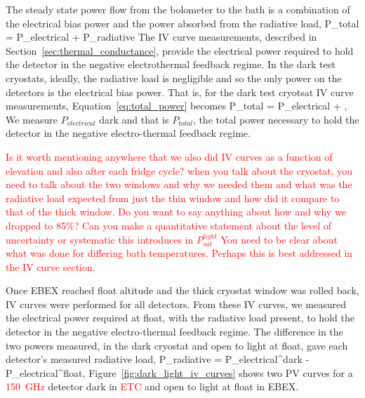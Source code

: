 The steady state power flow from the bolometer to the bath is a combination of the electrical bias power and the power absorbed from the radiative load,
\be
P_{total} = P_{electrical} + P_{radiative}
\label{eq:total_power}
\ee
The IV curve measurements, described in Section~\ref{sec:thermal_conductance}, provide the electrical power required to hold the detector in the negative electrothermal feedback regime. 
In the dark test cryostats, ideally, the radiative load is negligible and so the only power on the detectors is the electrical bias power. 
That is, for the dark test cryotsat IV curve measurements, Equation~\ref{eq:total_power} becomes
\be
P_{total} = P_{electrical} + ,
\label{eq:total_power_dark}
\ee
We measure $P_{electrical}$ dark and that is $P_{total}$, the total power necessary to hold the detector in the negative electro-thermal feedback regime. 


\textcolor{red}{Is it worth mentioning anywhere that we also did IV curves as a function of elevation and also after each fridge cycle?}
\textcolor{red}{when you talk about the cryostat, you need to talk about the two windows and why we needed them and what was the radiative load expected from just the thin window and how did it compare to that of the thick window.}
\textcolor{red}{Do you want to say anything about how and why we dropped to 85\%? Can you make a quantitative statement about the level of uncertainty or systematic this introduces in $P_{sat}^{light}$}
\textcolor{red}{You need to be clear about what was done for differing bath temperatures. Perhaps this is best addressed in the IV curve section.}


Once \ac{EBEX} reached float altitude and the thick cryostat window was rolled back, IV curves were performed for all detectors. 
From these IV curves, we measured the electrical power required at float, with the radiative load present, to hold the detector in the negative electro-thermal feedback regime. 
The difference in the two powers measured, in the dark cryostat and open to light at float, gave each detector's measured radiative load,
\be
P_{radiative} = P_{electrical}^{dark} - P_{electrical}^{float},
\label{eq:radiative_load}
\ee
Figure~\ref{fig:dark_light_iv_curves} shows two PV curves for a \textcolor{red}{150~GHz} detector dark in \textcolor{red}{\ac{ETC}} and open to light at float in \ac{EBEX}. 

